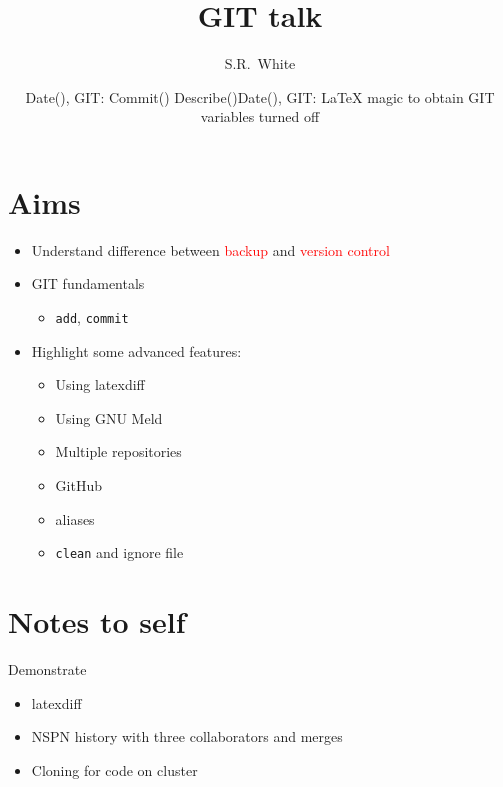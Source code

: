 \documentclass[a4paper,12pt]{article}
\date{{\small{}Date(\Date), GIT: Commit(\GITDate) Describe(\GITDescribe)}}
\date{{\small{}Date(\Date), GIT: \LaTeX{} magic to obtain GIT variables turned off}}
\title{GIT talk}
\author{S.R.~White}
\newcommand{\ALERT}[1]{\textcolor{red}{#1}}
\newcommand{\CMD}[1]{\texttt{#1}}
\begin{document}
\maketitle

\section{Aims}
\label{sec:aims}

\begin{itemize}
\item Understand difference between \ALERT{backup} and \ALERT{version
    control}
\item GIT fundamentals
  \begin{itemize}
  \item \CMD{add}, \CMD{commit}
  \end{itemize}
\item Highlight some advanced features:
  \begin{itemize}
  \item Using latexdiff
  \item Using GNU Meld
  \item Multiple repositories
  \item GitHub
  \item aliases
  \item \CMD{clean} and ignore file
  \end{itemize}
\end{itemize}

\section{Notes to self}
\label{sec:notes-self}

Demonstrate
\begin{itemize}
\item latexdiff
\item NSPN history with three collaborators and merges
\item Cloning for code on cluster
\end{itemize}
\end{document}
